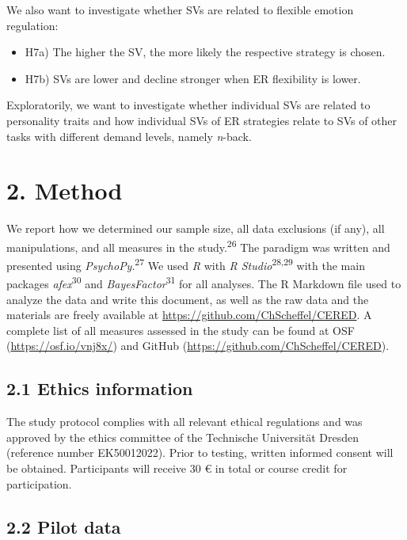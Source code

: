 \documentclass[
  english,
  man,floatsintext]{apa6}
\providecommand{\tightlist}{%
  \setlength{\itemsep}{0pt}\setlength{\parskip}{0pt}}
\begin{document}
We also want to investigate whether SVs are related to flexible emotion regulation:

\begin{itemize}
\tightlist
\item
  H7a) The higher the SV, the more likely the respective strategy is chosen.
\item
  H7b) SVs are lower and decline stronger when ER flexibility is lower.
\end{itemize}

Exploratorily, we want to investigate whether individual SVs are related to personality traits and how individual SVs of ER strategies relate to SVs of other tasks with different demand levels, namely \emph{n}-back.

\hypertarget{method}{%
\section{2. Method}\label{method}}

We report how we determined our sample size, all data exclusions (if any), all manipulations, and all measures in the study.\textsuperscript{26}
The paradigm was written and presented using \emph{PsychoPy}.\textsuperscript{27}
We used \emph{R} with \emph{R Studio}\textsuperscript{28,29} with the main packages \emph{afex}\textsuperscript{30} and \emph{BayesFactor}\textsuperscript{31} for all analyses.
The R Markdown file used to analyze the data and write this document, as well as the raw data and the materials are freely available at \url{https://github.com/ChScheffel/CERED}.
A complete list of all measures assessed in the study can be found at OSF (\url{https://osf.io/vnj8x/}) and GitHub (\url{https://github.com/ChScheffel/CERED}).

\hypertarget{ethics-information}{%
\subsection{2.1 Ethics information}\label{ethics-information}}

The study protocol complies with all relevant ethical regulations and was approved by the ethics committee of the Technische Universität Dresden (reference number EK50012022).
Prior to testing, written informed consent will be obtained.
Participants will receive 30 € in total or course credit for participation.

\hypertarget{pilot-data}{%
\subsection{2.2 Pilot data}\label{pilot-data}}
\end{document}
